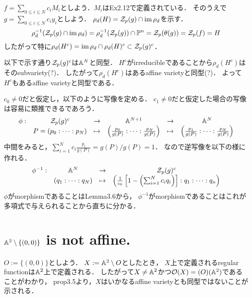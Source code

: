 \documentclass[a4paper]{jarticle}
\begin{document}
    $f=\sum_{0 \leq i \leq N}{c_i M_i}$としよう．$M_i$はEx2.12で定義されている．
    そのうえで$g=\sum_{0 \leq i \leq N}{c_i y_i}$としよう．
    $\rho_d(H)=\mathcal{Z}_p(g) \cap \operatorname{im} \rho_d$を示す．
    \[ \rho_d^{-1}(\mathcal{Z}_p(g) \cap \operatorname{im} \rho_d)=\rho_d^{-1}(\mathcal{Z}_p(g)) \cap \mathbb{P}^n=\mathcal{Z}_p(\theta(g))=\mathcal{Z}_p(f)=H \]
    したがって特に$\rho_d(H^c)=\operatorname{im} \rho_d \cap \rho_d(H)^c \subset \mathcal{Z}_p(g)^c$．

    以下で示す通り$\mathcal{Z}_p(g)^c$は$\mathbb{A}^N$と同型．
    $H^c$がirreducibleであることから$\rho_d(H^c)$はそのsubvariety(?)．
    したがって$\rho_d(H^c)$はあるaffine varietyと同型(?)．
    よって$H^c$もあるaffine varietyと同型である．

    $c_0 \neq 0$だと仮定し，以下のように写像を定める．
    $c_1 \neq 0$だと仮定した場合の写像は容易に類推できるであろう．
    \[
        \begin{array}{ccccccc}
        \phi:
            &\mathcal{Z}_p(g)^c
            &\to &\mathbb{A}^{N+1}
            &\to &\mathbb{A}^N \\
        {}  &P=(p_0:\dots:p_N)
            &\mapsto &\left( \frac{p_0}{g(P)}:\dots:\frac{p_N}{g(P)} \right)
            &\mapsto &\left( \frac{p_1}{g(P)}:\dots:\frac{p_N}{g(P)} \right)
    \end{array}
    \]
    中間をみると，$\sum_{i=1}^{N}{c_i \frac{p_i}{g(P)}}=g(P)/g(P)=1$．
    なので逆写像を以下の様に作れる．
    \[
        \begin{array}{ccccccc}
            \phi^{-1}:
            &\mathbb{A}^N
            &\to &\mathcal{Z}_p(g)^c \\
        {}  &(q_1:\dots:q_N)
            &\mapsto &\left( \frac{1}{c_0} \left[1-\left( \sum_{i=1}^{N}{c_i q_i} \right) \right]: q_1:\dots:q_n \right)
    \end{array}
    \]
    $\phi$がmorphismであることはLemma3.6から，
    $\phi^{-1}$がmorphismであることはこれが多項式で与えられることから直ちに分かる．

\section{$\mathbb{A}^2 \setminus \{(0,0)\}$ is not affine.} %
    $O:=\{(0,0)\}$としよう．
    $X:=\mathbb{A}^2 \setminus O$としたとき，
    $X$上で定義されるregular functionは$\mathbb{A}^2$上で定義される．
    したがって$X \neq \mathbb{A}^2$かつ$\mathcal{O}(X)=\mathcal(O)(\mathbb{A}^2)$であることがわかり，
    prop3.5より，$X$はいかなるaffine varietyとも同型ではないことが示される．
\end{document}
